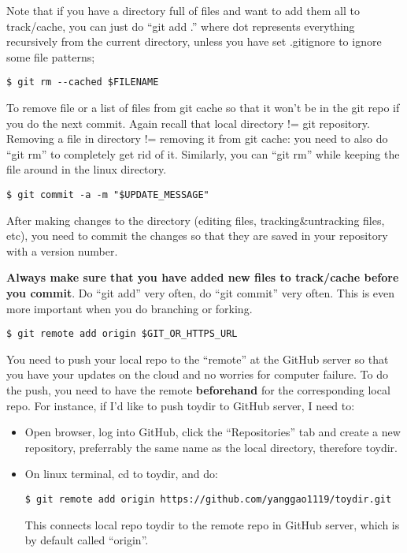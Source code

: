 \documentclass{article} %
\newcommand{\q}[1]{``#1''}
\begin{document}
Note that if you have a directory full of files and want to add them all to track/cache, you can just do \q{git add .} where dot represents everything recursively from the current directory, unless you have set .gitignore to ignore some file patterns;

\begin{lstlisting}
$ git rm --cached $FILENAME
\end{lstlisting}

To remove file or a list of files from git cache so that it won't be in the git repo if you do the next commit. Again recall that local directory != git repository. Removing a file in directory != removing it from git cache: you need to also do \q{git rm} to completely get rid of it. Similarly, you can \q{git rm} while keeping the file around in the linux directory.

\begin{lstlisting}
$ git commit -a -m "$UPDATE_MESSAGE"
\end{lstlisting}

After making changes to the directory (editing files, tracking\&untracking files, etc), you need to commit the changes so that they are saved in your repository with a version number.

\textbf{Always make sure that you have added new files to track/cache before you commit}. Do \q{git add} very often, do \q{git commit} very often. This is even more important when you do branching or forking.

\begin{lstlisting}
$ git remote add origin $GIT_OR_HTTPS_URL
\end{lstlisting}

You need to push your local repo to the \q{remote} at the GitHub server so that you have your updates on the cloud and no worries for computer failure. To do the push, you need to have the remote \textbf{beforehand} for the corresponding local repo. For instance, if I'd like to push toydir to GitHub server, I need to:

\begin{itemize}
	\item Open browser, log into GitHub, click the \q{Repositories} tab and create a new repository, preferrably the same name as the local directory, therefore toydir.
	\item On linux terminal, cd to toydir, and do:
	
\begin{lstlisting}
$ git remote add origin https://github.com/yanggao1119/toydir.git
\end{lstlisting}
	
	This connects local repo toydir to the remote repo in GitHub server, which is by default called \q{origin}.
\end{itemize}
\end{document}
